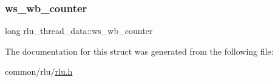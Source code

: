 \mbox{\label{structrlu__thread__data_a3df86ec9553b9f02863953e401b40a3d}} 
\subsubsection{\texorpdfstring{ws\+\_\+wb\+\_\+counter}{ws\_wb\_counter}}
{\footnotesize\ttfamily long rlu\+\_\+thread\+\_\+data\+::ws\+\_\+wb\+\_\+counter}



The documentation for this struct was generated from the following file\+:\begin{DoxyCompactItemize}
\item 
common/rlu/\hyperlink{rlu_8h}{rlu.\+h}\end{DoxyCompactItemize}
